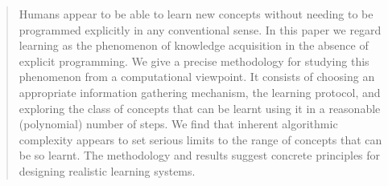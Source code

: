 \begin{abstract}
Humans appear to be able to learn new
concepts without needing to be programmed explicitly
in any conventional sense.  In this paper we regard
learning as the phenomenon of knowledge acquisition
in the absence of explicit programming.  We give a
precise methodology for studying this phenomenon
from a computational viewpoint.  It consists of
choosing an appropriate information gathering
mechanism, the learning protocol, and exploring the
class of concepts that can be learnt using it in a
reasonable (polynomial) number of steps.  We find
that inherent algorithmic complexity appears to set
serious limits to the range of concepts that can be
so learnt.  The methodology and results suggest
concrete principles for designing realistic learning
systems.
\end{abstract}
